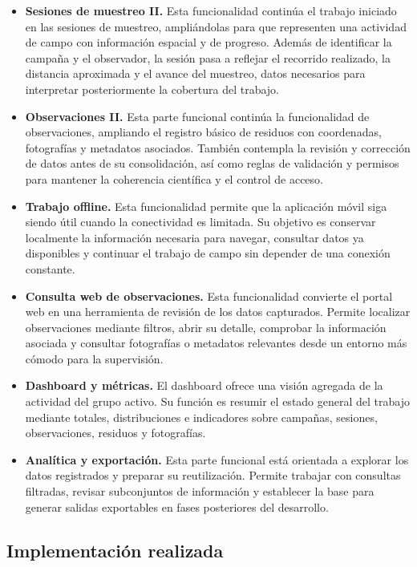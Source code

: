 \begin{itemize}[leftmargin=1.4em]
\item \textbf{Sesiones de muestreo II.} Esta funcionalidad continúa el trabajo iniciado en las sesiones de muestreo, ampliándolas para que representen una actividad de campo con información espacial y de progreso. Además de identificar la campaña y el observador, la sesión pasa a reflejar el recorrido realizado, la distancia aproximada y el avance del muestreo, datos necesarios para interpretar posteriormente la cobertura del trabajo.
\item \textbf{Observaciones II.} Esta parte funcional continúa la funcionalidad de observaciones, ampliando el registro básico de residuos con coordenadas, fotografías y metadatos asociados. También contempla la revisión y corrección de datos antes de su consolidación, así como reglas de validación y permisos para mantener la coherencia científica y el control de acceso.
\item \textbf{Trabajo offline.} Esta funcionalidad permite que la aplicación móvil siga siendo útil cuando la conectividad es limitada. Su objetivo es conservar localmente la información necesaria para navegar, consultar datos ya disponibles y continuar el trabajo de campo sin depender de una conexión constante.
\item \textbf{Consulta web de observaciones.} Esta funcionalidad convierte el portal web en una herramienta de revisión de los datos capturados. Permite localizar observaciones mediante filtros, abrir su detalle, comprobar la información asociada y consultar fotografías o metadatos relevantes desde un entorno más cómodo para la supervisión.
\item \textbf{Dashboard y métricas.} El dashboard ofrece una visión agregada de la actividad del grupo activo. Su función es resumir el estado general del trabajo mediante totales, distribuciones e indicadores sobre campañas, sesiones, observaciones, residuos y fotografías.
\item \textbf{Analítica y exportación.} Esta parte funcional está orientada a explorar los datos registrados y preparar su reutilización. Permite trabajar con consultas filtradas, revisar subconjuntos de información y establecer la base para generar salidas exportables en fases posteriores del desarrollo.
\end{itemize}
\subsection{Implementación realizada}

